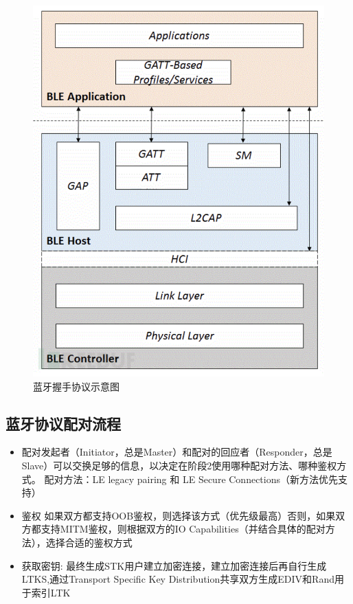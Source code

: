 \begin{figure}
    \centering
    \includegraphics[scale=0.5]{resources/img/i15.png}
    \caption{蓝牙握手协议示意图}
  \end{figure}

\subsection[]{蓝牙协议配对流程}
\begin{itemize}
    \item 配对发起者（Initiator，总是Master）和配对的回应者（Responder，总是Slave）可以交换足够的信息，以决定在阶段2使用哪种配对方法、哪种鉴权方式。
    配对方法：LE legacy pairing 和 LE Secure Connections（新方法优先支持）
    \item 鉴权 如果双方都支持OOB鉴权，则选择该方式（优先级最高）否则，如果双方都支持MITM鉴权，则根据双方的IO Capabilities（并结合具体的配对方法），选择合适的鉴权方式
    \item 获取密钥: 最终生成STK用户建立加密连接，建立加密连接后再自行生成LTKS,通过Transport Specific Key Distribution共享双方生成EDIV和Rand用于索引LTK
\end{itemize}

